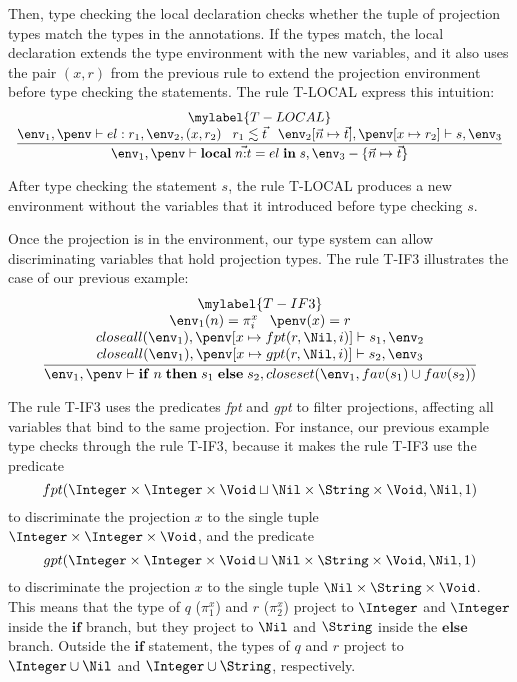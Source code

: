 Then, type checking the local declaration checks whether the tuple of projection
types match the types in the annotations.
If the types match, the local declaration extends the type environment with the
new variables, and it also uses the pair $(x,r)$ from the previous rule to
extend the projection environment before type checking the statements.
The rule \textsc{T-LOCAL} express this intuition:
\[
\begin{array}{c}
\mylabel{T-LOCAL}\\
\dfrac{\env_{1}, \penv \vdash el:r_{1}, \env_{2}, (x,r_{2}) \;\;\;
       r_{1} \lesssim \vec{t} \;\;\;
       \env_{2}[\vec{n} \mapsto \vec{t}], \penv[x \mapsto r_{2}] \vdash s, \env_{3}}
      {\env_{1}, \penv \vdash \mathbf{local} \; \vec{n{:}t} = el \; \mathbf{in} \; s, \env_{3} - \{\vec{n} \mapsto \vec{t}\}}
\end{array}
\]

After type checking the statement $s$, the rule \textsc{T-LOCAL} produces a
new environment without the variables that it introduced before type checking $s$.

Once the projection is in the environment, our type system can allow
discriminating variables that hold projection types.
The rule \textsc{T-IF3} illustrates the case of our previous example:
\[
\begin{array}{c}
\mylabel{T-IF3}\\
\dfrac{\begin{array}{c}
       \env_{1}(n) = \pi_{i}^{x} \;\;\; \penv(x) = r\\
       closeall(\env_{1}), \penv[x \mapsto fpt(r,\Nil,i)] \vdash s_{1}, \env_{2} \\
       closeall(\env_{1}), \penv[x \mapsto gpt(r,\Nil,i)] \vdash s_{2}, \env_{3}
      \end{array}}
      {\env_{1}, \penv \vdash \mathbf{if} \; n \; \mathbf{then} \; s_{1} \; \mathbf{else} \; s_{2}, closeset(\env_{1}, fav(s_{1}) \cup fav(s_{2}))}
\end{array}
\]

The rule \textsc{T-IF3} uses the predicates \emph{fpt} and \emph{gpt}
to filter projections, affecting all variables that bind to the same projection.
For instance, our previous example type checks through the rule \textsc{T-IF3},
because it makes the rule \textsc{T-IF3} use the predicate
\[
fpt(\Integer \times \Integer \times \Void \sqcup \Nil \times \String \times \Void, \Nil, 1)
\]
to discriminate the projection $x$ to the single tuple
$\Integer \times \Integer \times \Void$, and the predicate
\[
gpt(\Integer \times \Integer \times \Void \sqcup \Nil \times \String \times \Void, \Nil, 1)
\]
to discriminate the projection $x$ to the single tuple
$\Nil \times \String \times \Void$.
This means that the type of $q$ ($\pi_{1}^{x}$) and $r$ ($\pi_{2}^{x}$)
project to $\Integer$ and $\Integer$ inside the $\mathbf{if}$ branch,
but they project to $\Nil$ and $\String$ inside the $\mathbf{else}$ branch.
Outside the $\mathbf{if}$ statement, the types of $q$ and $r$ project
to $\Integer \cup \Nil$ and $\Integer \cup \String$, respectively.


